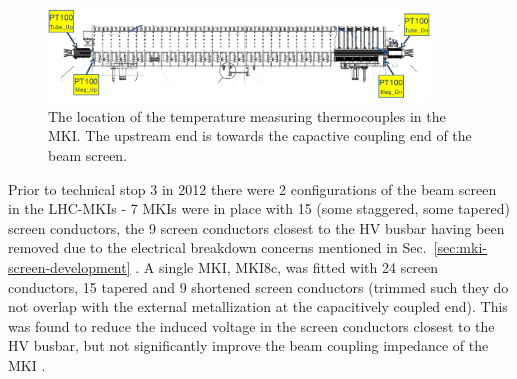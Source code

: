 \begin{figure}
\begin{center}
\includegraphics[width=0.9\textwidth]{LHC_MKI/figures/pt100Loc.png}
\end{center}
\caption{The location of the temperature measuring thermocouples in the MKI. The upstream end is towards the capactive coupling end of the beam screen.}
\label{fig:mki-thermacouple-location}
\end{figure}

Prior to technical stop 3 in 2012 there were 2 configurations of the beam screen in the LHC-MKIs - 7 MKIs were in place with 15 (some staggered, some tapered) screen conductors, the 9 screen conductors closest to the HV busbar having been removed due to the electrical breakdown concerns mentioned in Sec.~\ref{sec:mki-screen-development} \cite{Barnes:improvBeamScreen}. A single MKI, MKI8c, was fitted with 24 screen conductors, 15 tapered and 9 shortened screen conductors (trimmed such they do not overlap with the external metallization at the capacitively coupled end). This was found to reduce the induced voltage in the screen conductors closest to the HV busbar, but not significantly improve the beam coupling impedance of the MKI \cite{Barnes:improvBeamScreen}.